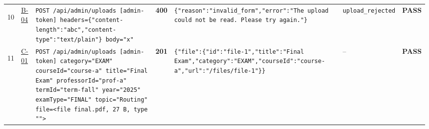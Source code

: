 \documentclass[10pt,a4paper]{article}
\begin{document}
\begin{landscape}
\begin{longtable}{@{}P{0.6cm}P{0.9cm}P{8.5cm}P{1.0cm}P{6.2cm}P{4.2cm}P{1.1cm}@{}}
\hypertarget{call10}{10} & \hyperlink{test-B-04}{B-04} & \texttt{POST /\allowbreak{}api/\allowbreak{}admin/\allowbreak{}uploads [admin-\allowbreak{}token] headers=\allowbreak{}\{"\allowbreak{}content-\allowbreak{}length"\allowbreak{}:\allowbreak{}"\allowbreak{}abc"\allowbreak{},\allowbreak{}"\allowbreak{}content-\allowbreak{}type"\allowbreak{}:\allowbreak{}"\allowbreak{}text/\allowbreak{}plain"\allowbreak{}\} body=\allowbreak{}"\allowbreak{}x"\allowbreak{}} & \textcolor{warnamber}{\textbf{400}} & \texttt{\{"\allowbreak{}reason"\allowbreak{}:\allowbreak{}"\allowbreak{}invalid\_\allowbreak{}form"\allowbreak{},\allowbreak{}"\allowbreak{}error"\allowbreak{}:\allowbreak{}"\allowbreak{}The upload could not be read.\allowbreak{} Please try again.\allowbreak{}"\allowbreak{}\}} & \texttt{upload\_\allowbreak{}rejected} & \textcolor{passgreen}{\textbf{PASS}} \\
\hypertarget{call11}{11} & \hyperlink{test-C-01}{C-01} & \texttt{POST /\allowbreak{}api/\allowbreak{}admin/\allowbreak{}uploads [admin-\allowbreak{}token] category=\allowbreak{}"\allowbreak{}EXAM"\allowbreak{} courseId=\allowbreak{}"\allowbreak{}course-\allowbreak{}a"\allowbreak{} title=\allowbreak{}"\allowbreak{}Final Exam"\allowbreak{} professorId=\allowbreak{}"\allowbreak{}prof-\allowbreak{}a"\allowbreak{} termId=\allowbreak{}"\allowbreak{}term-\allowbreak{}fall"\allowbreak{} year=\allowbreak{}"\allowbreak{}2025"\allowbreak{} examType=\allowbreak{}"\allowbreak{}FINAL"\allowbreak{} topic=\allowbreak{}"\allowbreak{}Routing"\allowbreak{} file=\allowbreak{}<file final.\allowbreak{}pdf,\allowbreak{} 27 B,\allowbreak{} type "\allowbreak{}"\allowbreak{}>} & \textcolor{passgreen}{\textbf{201}} & \texttt{\{"\allowbreak{}file"\allowbreak{}:\allowbreak{}\{"\allowbreak{}id"\allowbreak{}:\allowbreak{}"\allowbreak{}file-\allowbreak{}1"\allowbreak{},\allowbreak{}"\allowbreak{}title"\allowbreak{}:\allowbreak{}"\allowbreak{}Final Exam"\allowbreak{},\allowbreak{}"\allowbreak{}category"\allowbreak{}:\allowbreak{}"\allowbreak{}EXAM"\allowbreak{},\allowbreak{}"\allowbreak{}courseId"\allowbreak{}:\allowbreak{}"\allowbreak{}course-\allowbreak{}a"\allowbreak{},\allowbreak{}"\allowbreak{}url"\allowbreak{}:\allowbreak{}"\allowbreak{}/\allowbreak{}files/\allowbreak{}file-\allowbreak{}1"\allowbreak{}\}\}} & -- & \textcolor{passgreen}{\textbf{PASS}} \\

\end{longtable}
\end{landscape}
\end{document}

